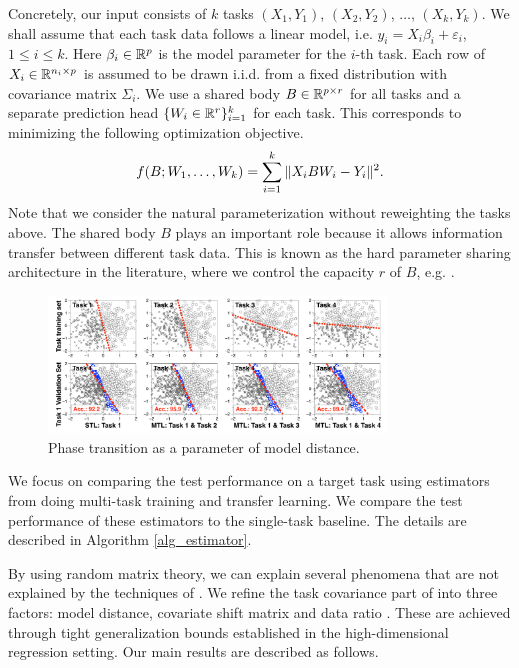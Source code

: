 Concretely, our input consists of $k$ tasks $(X_1, Y_1)$, $(X_2, Y_2)$, $\dots$, $(X_k, Y_k)$.
We shall assume that each task data follows a linear model, i.e. $y_i = X_i \beta_i + \varepsilon_i$, $1\le i\le k$.
Here $\beta_i\in\mathbb{R}^p$ is the model parameter for the $i$-th task.
Each row of $X_i\in\mathbb{R}^{n_i\times p}$ is assumed to be drawn i.i.d. from a fixed distribution with covariance matrix $\Sigma_i$.
We use a shared body $B\in\mathbb{R}^{p\times r}$ for all tasks and a separate prediction head $\{W_i \in \mathbb{R}^{r}\}_{i=1}^k$ for each task.
This corresponds to minimizing the following optimization objective.
\begin{align}
	\label{eq_mtl}
	f(B; W_1, \dots, W_k) = \sum_{i=1}^k \|X_i B W_i - Y_i\|^2.
\end{align}
Note that we consider the natural parameterization without reweighting the tasks above.
The shared body $B$ plays an important role because it allows information transfer between different task data.
This is known as the hard parameter sharing architecture in the literature, where we control the capacity $r$ of $B$, e.g. \cite{KD12,WZR20}.

\begin{figure}[!t]
	\centering
	\includegraphics[width=0.8\textwidth]{figures/model_distance_motivation.pdf}
	\caption{Phase transition as a parameter of model distance.}
	\label{fig_motivation}
\end{figure}

We focus on comparing the test performance on a target task using estimators from doing multi-task training and transfer learning.
We compare the test performance of these estimators to the single-task baseline.
The details are described in Algorithm \ref{alg_estimator}.

By using random matrix theory, we can explain several phenomena that are not explained by the techniques of \cite{WZR20}.
We refine the task covariance part of \cite{WZR20} into three factors: model distance, covariate shift matrix and data ratio \cite{PY09,K18}.
These are achieved through tight generalization bounds established in the high-dimensional regression setting.
Our main results are described as follows.


